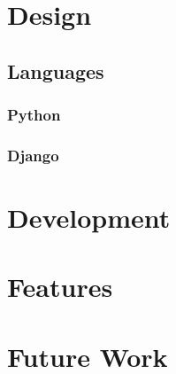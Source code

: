 \documentclass{article}
\begin{document}
\section{Design}
	\subsection{Languages}
		\subsubsection{Python}
		\subsubsection{Django}
\section{Development}
\section{Features}
\section{Future Work}

\printbibliography[title={Bibliography}]
\end{document}
